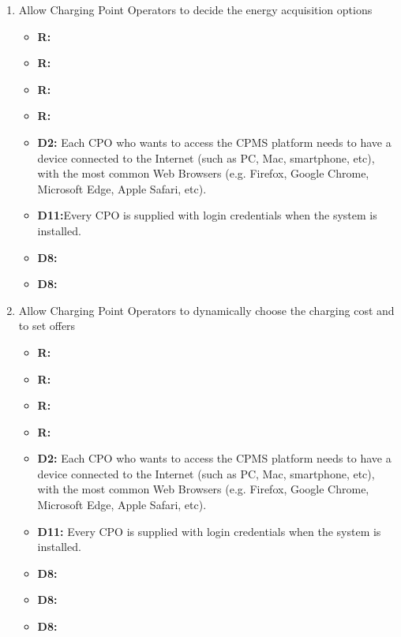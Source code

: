 \begin{enumerate}[label=\textbf{-G\arabic*}:]
{\begin{itemize}
          \end{itemize}
          }


          \item {Allow Charging Point Operators to decide the energy acquisition options
          \begin{itemize}
              \item \textbf{R:} 
              \item \textbf{R:} 
              \item \textbf{R:} 
              \item \textbf{R:} 
              \item \textbf{D2:} Each CPO who wants to access the CPMS platform needs to have a device connected to the Internet (such as PC, Mac, smartphone, etc), with the most common Web Browsers (e.g. Firefox, Google Chrome, Microsoft Edge, Apple Safari, etc).
              \item \textbf{D11:}Every CPO is supplied with login credentials when the system is installed.
              \item \textbf{D8:}
              \item \textbf{D8:} 
              
          \end{itemize}
          }


          \item {Allow Charging Point Operators to dynamically choose the charging cost and to set offers
          \begin{itemize}
              \item \textbf{R:} 
              \item \textbf{R:} 
              \item \textbf{R:} 
              \item \textbf{R:} 
              \item \textbf{D2:} Each CPO who wants to access the CPMS platform needs to have a device connected to the Internet (such as PC, Mac, smartphone, etc), with the most common Web Browsers (e.g. Firefox, Google Chrome, Microsoft Edge, Apple Safari, etc).
              \item \textbf{D11:} Every CPO is supplied with login credentials when the system is installed.
              \item \textbf{D8:}
              \item \textbf{D8:}
              \item \textbf{D8:} 
              
          \end{itemize}
          }
\end{enumerate}

